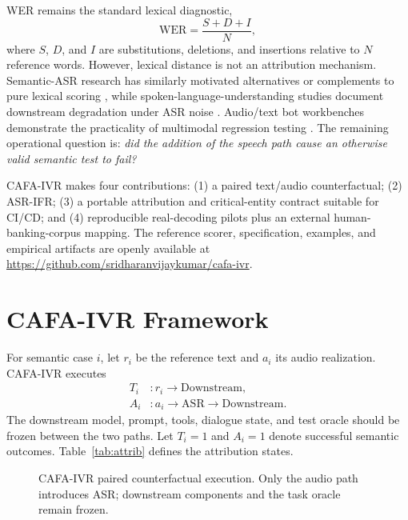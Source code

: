 \documentclass[conference]{IEEEtran}
\begin{document}
WER remains the standard lexical diagnostic,
\begin{equation}
\mathrm{WER}=\frac{S+D+I}{N},
\end{equation}
where $S$, $D$, and $I$ are substitutions, deletions, and insertions relative to $N$ reference words. However, lexical distance is not an attribution mechanism. Semantic-ASR research has similarly motivated alternatives or complements to pure lexical scoring \cite{kim2021,roy2021}, while spoken-language-understanding studies document downstream degradation under ASR noise \cite{sengupta2021}. Audio/text bot workbenches demonstrate the practicality of multimodal regression testing \cite{awslex}. The remaining operational question is: \emph{did the addition of the speech path cause an otherwise valid semantic test to fail?}

CAFA-IVR makes four contributions: (1) a paired text/audio counterfactual; (2) ASR-IFR; (3) a portable attribution and critical-entity contract suitable for CI/CD; and (4) reproducible real-decoding pilots plus an external human-banking-corpus mapping. The reference scorer, specification, examples, and empirical artifacts are openly available at \url{https://github.com/sridharanvijaykumar/cafa-ivr}.

\section{CAFA-IVR Framework}
For semantic case $i$, let $r_i$ be the reference text and $a_i$ its audio realization. CAFA-IVR executes
\begin{align}
T_i &: r_i \rightarrow \mathrm{Downstream},\\
A_i &: a_i \rightarrow \mathrm{ASR} \rightarrow \mathrm{Downstream}.
\end{align}
The downstream model, prompt, tools, dialogue state, and test oracle should be frozen between the two paths. Let $T_i=1$ and $A_i=1$ denote successful semantic outcomes. Table~\ref{tab:attrib} defines the attribution states.

\begin{figure}[t]
\centering
{}
\caption{CAFA-IVR paired counterfactual execution. Only the audio path introduces ASR; downstream components and the task oracle remain frozen.}
\label{fig:cafa}
\end{figure}
\end{document}
